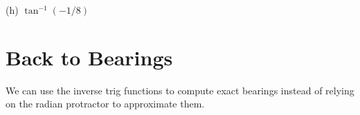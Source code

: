\documentclass{ximera}
\begin{document}
\begin{question}
(h) $\tan^{-1}(-1/8)$

\begin{exploration}\label{Exp3:Comp}

 
\begin{onlineOnly}
    \begin{center}
\end{center}
\end{onlineOnly}
\end{exploration}

\end{question}


\section{Back to Bearings}
We can use the inverse trig functions to compute exact bearings instead of relying on the radian protractor to approximate them.
\end{document}
